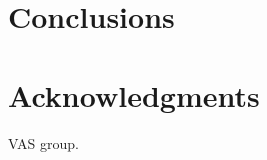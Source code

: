 \documentclass{article}
\begin{document}
\section{Conclusions}



\section*{Acknowledgments}
VAS group.



\end{document}
